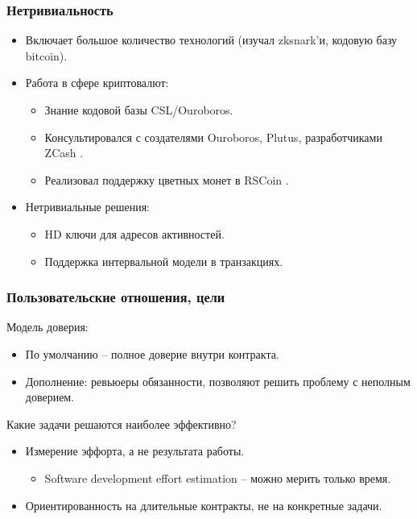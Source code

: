 \documentclass[11pt,handout,pdf,hyperref={unicode}]{beamer}
\newcommand{\backupend}{
   \setcounter{framenumber}{\value{finalframe}}
}
\begin{document}
\begin{frame}
  \frametitle{Нетривиальность}

  \begin{itemize}
  \item Включает большое количество технологий (изучал zksnark'и,
    кодовую базу bitcoin).
  \item Работа в сфере криптовалют:
    \begin{itemize}
    \item Знание кодовой базы CSL/Ouroboros.
    \item Консультировался с создателями Ouroboros,
      Plutus\parencite{plutus}, разработчиками ZCash
      \parencite{zerocash}.
    \item Реализовал поддержку цветных монет в RSCoin
      \parencite{rscoin}.
    \end{itemize}
  \item Нетривиальные решения:
    \begin{itemize}
    \item HD ключи для адресов активностей.
    \item Поддержка интервальной модели в транзакциях.
    \end{itemize}
  \end{itemize}
\end{frame}

\begin{frame}
  \frametitle{Пользовательские отношения, цели}

  Модель доверия:
  \begin{itemize}
  \item По умолчанию -- полное доверие внутри контракта.
  \item Дополнение: ревьюеры обязанности, позволяют решить проблему с
    неполным доверием.
  \end{itemize}

  Какие задачи решаются наиболее эффективно?
  \begin{itemize}
  \item Измерение эффорта, а не результата работы.
    \begin{itemize}
    \item Software development effort estimation -- можно мерить только время.
    \end{itemize}
  \item Ориентированность на длительные контракты, не на конкретные задачи.
  \end{itemize}

\end{frame}

\backupend
\end{document}
